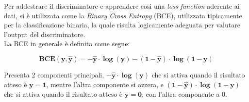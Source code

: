 Per addestrare il discriminatore e apprendere così una \textit{loss function} aderente ai dati, si è utilizzata come la \textit{Binary Cross Entropy} (BCE), 
utilizzata tipicamente per la classificazione binaria, la quale risulta logicamente adeguata per valutare l'output del discriminatore.\\
La BCE in generale è definita come segue:

\begin{equation}
    \mathbf{BCE(y, \hat{y}) = -\hat{y} \cdot \log(y) - (1-\hat{y}) \cdot \log(1-y)}
\end{equation}

Presenta 2 componenti principali, $\mathbf{-\hat{y} \cdot \log(y)}$ che si attiva quando il risultato atteso è $\mathbf{y = 1}$, mentre l'altra componente si azzera,
e $\mathbf{(1-\hat{y}) \cdot \log(1-y)}$ che si attiva quando il risultato atteso è $\mathbf{y = 0}$, con l'altra componente a 0.

